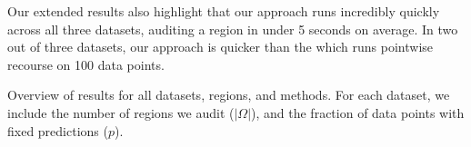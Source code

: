 Our extended results also highlight that our approach runs incredibly quickly across all three datasets, auditing a region in under 5 seconds on average. In two out of three datasets, our approach is quicker than the  which runs pointwise recourse on 100 data points.

\begin{table}[t!]
    \centering
    \resizebox{0.7\textwidth}{!}{}
    \caption{Overview of results for all datasets, regions, and methods. For each dataset, we include the number of regions we audit ($|\Omega|$), and the fraction of data points with fixed predictions ($p$). }
    \vspace{-1em}
    \label{tab:full_results}
\end{table}
